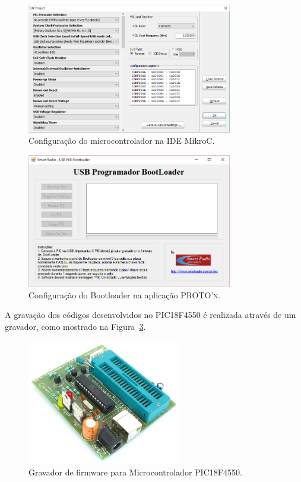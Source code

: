 \documentclass[
	12pt,				%
	openright,			%
  oneside,     %
	a4paper,			%
	english,			%
	french,				%
	spanish,			%
	brazil				%
	]{abntex2}
\begin{document}
\begin{figure}[!ht]
  \centering
  \caption{\label{fig:cha-3-mikroC-Pro01}Configuração do microcontrolador na IDE MikroC.}
  \includegraphics[width=0.8\textwidth]{images/Atividade03/mikroC-PRO01.png}
\end{figure}

\begin{figure}[!ht]
  \centering
  \caption{\label{fig:cha-3-PROTOn-BOOTLOADER}Configuração do Bootloader na aplicação \textsc{PROTO'n}.}
  \includegraphics[width=0.8\textwidth]{images/Atividade03/PROTOn-BOOTLOADER.png}
\end{figure}

A gravação dos códigos desenvolvidos no PIC18F4550 é realizada através de um gravador, como mostrado na Figura~\ref{fig:04GravadorPIC}.

\begin{figure}[ht]
  \centering
  \caption{\label{fig:04GravadorPIC}Gravador de firmware para Microcontrolador PIC18F4550.}
  \includegraphics[width=0.6\textwidth]{images/Atividade03/04GravadorPIC.jpg}
\end{figure}
\end{document}
